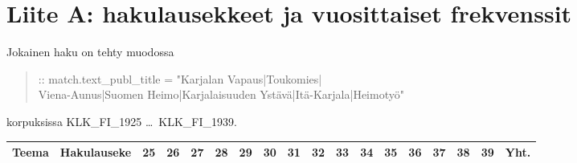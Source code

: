 \documentclass[10pt,a4paper]{article}
\begin{document}
\appendix
\section{Liite A: hakulausekkeet ja vuosittaiset frekvenssit}

Jokainen haku on tehty muodossa

\begin{quote}\small\ttfamily
[word="LAUSEKE" \%c] :: match.text\_publ\_title = "Karjalan Vapaus|Toukomies|\\
Viena-Aunus|Suomen Heimo|Karjalaisuuden Ystävä|Itä-Karjala|Heimotyö"
\end{quote}

korpuksissa KLK\_FI\_1925 \dots\ KLK\_FI\_1939.

\begin{center}\scriptsize
\begin{longtable}{@{}lp{52mm}rrrrrrrrrrrrrrrr@{}}
\toprule
\textbf{Teema} & \textbf{Hakulauseke} & \textbf{25} & \textbf{26} & \textbf{27} & \textbf{28} & \textbf{29} & \textbf{30} & \textbf{31} & \textbf{32} & \textbf{33} & \textbf{34} & \textbf{35} & \textbf{36} & \textbf{37} & \textbf{38} & \textbf{39} & \textbf{Yht.} \\
\midrule
\endhead


\end{longtable}
\end{center}
\end{document}
